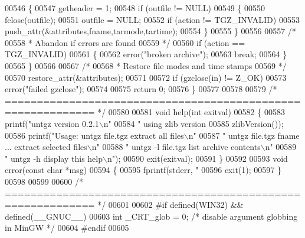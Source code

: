 \begin{DoxyCode}
{{{{{{{{{{00546         \{
00547           getheader = 1;
00548           \textcolor{keywordflow}{if} (outfile != NULL)
00549             \{
00550               fclose(outfile);
00551               outfile = NULL;
00552               \textcolor{keywordflow}{if} (action != TGZ\_INVALID)
00553                 push\_attr(&attributes,fname,tarmode,tartime);
00554             \}
00555         \}
00556 
00557       \textcolor{comment}{/*}
00558 \textcolor{comment}{       * Abandon if errors are found}
00559 \textcolor{comment}{       */}
00560       \textcolor{keywordflow}{if} (action == TGZ\_INVALID)
00561         \{
00562           error(\textcolor{stringliteral}{"broken archive"});
00563           \textcolor{keywordflow}{break};
00564         \}
00565     \}
00566 
00567   \textcolor{comment}{/*}
00568 \textcolor{comment}{   * Restore file modes and time stamps}
00569 \textcolor{comment}{   */}
00570   restore\_attr(&attributes);
00571 
00572   \textcolor{keywordflow}{if} (gzclose(in) != Z\_OK)
00573     error(\textcolor{stringliteral}{"failed gzclose"});
00574 
00575   \textcolor{keywordflow}{return} 0;
00576 \}
00577 
00578 
00579 \textcolor{comment}{/* ============================================================ */}
00580 
00581 \textcolor{keywordtype}{void} help(\textcolor{keywordtype}{int} exitval)
00582 \{
00583   printf(\textcolor{stringliteral}{"untgz version 0.2.1\(\backslash\)n"}
00584          \textcolor{stringliteral}{"  using zlib version %
00585          zlibVersion());
00586   printf(\textcolor{stringliteral}{"Usage: untgz file.tgz            extract all files\(\backslash\)n"}
00587          \textcolor{stringliteral}{"       untgz file.tgz fname ...  extract selected files\(\backslash\)n"}
00588          \textcolor{stringliteral}{"       untgz -l file.tgz         list archive contents\(\backslash\)n"}
00589          \textcolor{stringliteral}{"       untgz -h                  display this help\(\backslash\)n"});
00590   exit(exitval);
00591 \}
00592 
00593 \textcolor{keywordtype}{void} error(\textcolor{keyword}{const} \textcolor{keywordtype}{char} *msg)
00594 \{
00595   fprintf(stderr, \textcolor{stringliteral}{"%
00596   exit(1);
00597 \}
00598 
00599 
00600 \textcolor{comment}{/* ============================================================ */}
00601 
00602 \textcolor{preprocessor}{#if defined(WIN32) && defined(\_\_GNUC\_\_)}
00603 \textcolor{keywordtype}{int} \_CRT\_glob = 0;      \textcolor{comment}{/* disable argument globbing in MinGW */}
00604 \textcolor{preprocessor}{#endif}
00605 
}}}}}}}}}}}}
\end{DoxyCode}
